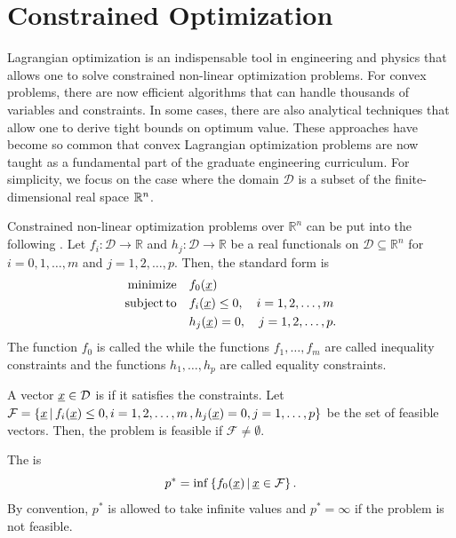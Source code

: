 \section{Constrained Optimization}

Lagrangian optimization is an indispensable tool in engineering and physics that allows one to solve constrained non-linear optimization problems.
For convex problems, there are now efficient algorithms that can handle thousands of variables and constraints.
In some cases, there are also analytical techniques that allow one to derive tight bounds on optimum value.
These approaches have become so common that convex Lagrangian optimization problems are now taught as a fundamental part of the graduate engineering curriculum.
For simplicity, we focus on the case where the domain $\mathcal{D}$ is a subset of the finite-dimensional real space $\mathbb{R}^n$.

Constrained non-linear optimization problems over $\mathbb{R}^n$ can be put into the following .
Let $f_i \colon \mathcal{D} \rightarrow \mathbb{R}$ and $h_j \colon \mathcal{D} \rightarrow \mathbb{R}$ be a real functionals on $\mathcal{D} \subseteq \mathbb{R}^n$ for $i=0,1,\ldots,m$ and $j=1,2,\ldots,p$.
Then, the standard form is
\begin{align*}
\mathrm{minimize} \quad & f_0 (\underline{x}) \\
\mathrm{subject\,to} \quad & f_i (\underline{x}) \leq 0, \quad i=1,2,\ldots,m \\
& h_j (\underline{x}) = 0, \quad j=1,2,\ldots,p.
\end{align*}
The function $f_0$ is called the  while the functions $f_1,\ldots,f_m$ are called inequality constraints and the functions $h_1,\ldots,h_p$ are called equality constraints.

\begin{definition}
A vector $\underline{x} \in \mathcal{D}$ is  if it satisfies the constraints.
Let $\mathcal{F} = \{ \underline{x} \, | \,  f_i (\underline{x}) \leq 0, i=1,2,\ldots,m \, , h_j (\underline{x}) = 0, j=1,\ldots,p \}$ be the set of feasible vectors.
Then, the problem is feasible if $\mathcal{F} \neq \emptyset$.
\end{definition}

\begin{definition}
The  is
\[ p^* = \inf \left\{ f_0 (\underline{x}) \, | \, \underline{x} \in \mathcal{F} \right\}. \]
By convention, $p^*$ is allowed to take infinite values and $p^* = \infty$ if the problem is not feasible.
\end{definition}

